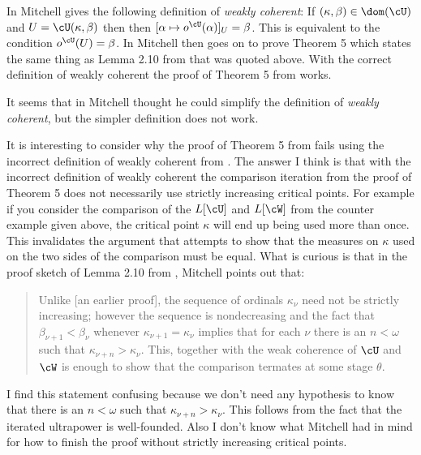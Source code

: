 \documentclass[oneside,12pt]{amsart}
\begin{document}
In \cite{Mitchell-Revisited} Mitchell gives the following definition of \emph{weakly coherent}:
If $(\kappa,\beta) \in \dom(\cU)$  and $U = \cU(\kappa, \beta)$ then
then  $[\alpha \mapsto o^{\cU}(\alpha)]_{U} = \beta$. This is equivalent to the condition
$o^{\cU}(U)=\beta$. In \cite{Mitchell-Revisited} Mitchell then goes on to prove Theorem 5 which states
the same thing as Lemma 2.10 from \cite{BeginningInnerModelTheory} that was quoted above.
With the correct definition of weakly coherent the proof of Theorem 5 from
\cite{Mitchell-Revisited} works.

It seems that in \cite{BeginningInnerModelTheory} Mitchell thought he could
simplify the definition of \emph{weakly coherent}, but the simpler definition does not work.

It is interesting to consider why the proof of Theorem 5 from \cite{Mitchell-Revisited} fails using
the incorrect definition of weakly coherent from \cite{BeginningInnerModelTheory}. The answer I think
is that with the incorrect definition of weakly coherent the comparison iteration from the proof
of Theorem 5 does not necessarily use strictly increasing critical points. For example if you consider
the comparison of the $L[\cU]$ and $L[\cW]$ from the counter example given above, the critical point
$\kappa$ will end up being used more than once. This invalidates the argument that attempts to show
that the measures on $\kappa$ used on the two sides of the comparison must be equal. What is curious
is that in the proof sketch of Lemma 2.10 from \cite{BeginningInnerModelTheory}, Mitchell points
out that:
\begin{quote}
Unlike [an earlier proof], the sequence of ordinals $\kappa_{\nu}$ need not be strictly increasing;
however the sequence is nondecreasing and the fact that $\beta_{\nu+1} <\beta_{\nu}$ whenever
$\kappa_{\nu+1} = \kappa_{\nu}$ implies that for each $\nu$ there is an $n < \omega$ such that
$\kappa_{\nu + n} > \kappa_{\nu}$. This, together with the weak coherence of $\cU$ and $\cW$ is
enough to show that the comparison termates at some stage $\theta$.
\end{quote}

I find this statement confusing because we don't need any hypothesis to know that
there is an $n < \omega$ such that $\kappa_{\nu + n} > \kappa_{\nu}$. This follows from the fact that
the iterated ultrapower is well-founded. Also I don't know what Mitchell had in mind for how to
finish the proof without strictly increasing critical points.
\end{document}
